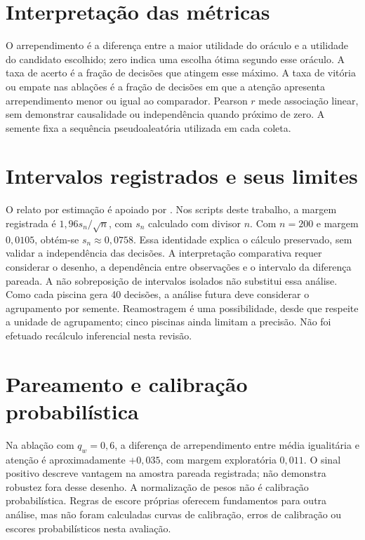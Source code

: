 \documentclass[12pt,openany,oneside,a4paper,brazil,chapter=TITLE]{abntex2}
\let\cite\citep
\begin{document}


\section{Interpretação das métricas}
O arrependimento é a diferença entre a maior utilidade do oráculo e a utilidade do candidato escolhido; zero indica uma escolha ótima segundo esse oráculo. A taxa de acerto é a fração de decisões que atingem esse máximo. A taxa de vitória ou empate nas ablações é a fração de decisões em que a atenção apresenta arrependimento menor ou igual ao comparador. Pearson $r$ mede associação linear, sem demonstrar causalidade ou independência quando próximo de zero. A semente fixa a sequência pseudoaleatória utilizada em cada coleta.
\section{Intervalos registrados e seus limites}
O relato por estimação é apoiado por \citet{cumming2014,wasserstein2016}. Nos scripts deste trabalho, a margem registrada é $1{,}96s_n/\sqrt{n}$, com $s_n$ calculado com divisor $n$. Com $n=200$ e margem $0{,}0105$, obtém-se $s_n\approx0{,}0758$. Essa identidade explica o cálculo preservado, sem validar a independência das decisões. A interpretação comparativa requer considerar o desenho, a dependência entre observações e o intervalo da diferença pareada. A não sobreposição de intervalos isolados não substitui essa análise.
Como cada piscina gera 40 decisões, a análise futura deve considerar o agrupamento por semente. Reamostragem \cite{efron1979} é uma possibilidade, desde que respeite a unidade de agrupamento; cinco piscinas ainda limitam a precisão. Não foi efetuado recálculo inferencial nesta revisão.
\section{Pareamento e calibração probabilística}
Na ablação com $q_w=0{,}6$, a diferença de arrependimento entre média igualitária e atenção é aproximadamente $+0{,}035$, com margem exploratória $0{,}011$. O sinal positivo descreve vantagem na amostra pareada registrada; não demonstra robustez fora desse desenho. A normalização de pesos não é calibração probabilística. Regras de escore próprias \cite{gneiting2007} oferecem fundamentos para outra análise, mas não foram calculadas curvas de calibração, erros de calibração ou escores probabilísticos nesta avaliação.
\end{document}
